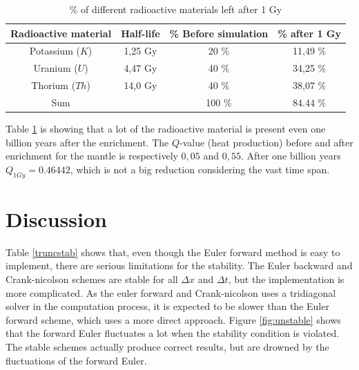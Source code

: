 \documentclass[10pt,a4paper]{article}
\begin{document}
\begin{table} [H]
\centering
\caption{\% of different radioactive materials left after 1 Gy}
\begin{tabular}{|c|c|c|c|}
\hline
Radioactive material & Half-life & \% Before simulation & \% after 1 Gy\\
\hline
Potassium ($K$) 	 & 1,25 Gy   & 20 \% 				 & 11,49 \% \\
\hline
Uranium ($U$)	     & 4,47 Gy   & 40 \%				 & 34,25 \% \\
\hline
Thorium ($Th$)		 & 14,0 Gy	 & 40 \%				 & 38,07 \% \\
\hline
Sum					 & 			 & 100 \% 				 & 84.44 \%\\
\hline
\end{tabular}
\label{Decay}
\end{table}

\noindent Table \ref{Decay} is showing that a lot of the radioactive material is present even one billion years after the enrichment. The $Q$-value (heat production) before and after enrichment for the mantle is respectively $0,05$ and $0,55$. After one billion years $Q_{1Gy}=0.46442$, which is not a big reduction considering the vast time span.   


\section*{Discussion}

Table \ref{truncstab} shows that, even though the Euler forward method is easy to implement, there are serious limitations for the stability. The Euler backward and Crank-nicolson schemes are stable for all $\Delta x$ and $\Delta t$, but the implementation is more complicated. As the euler forward and Crank-nicolson uses a tridiagonal solver in the computation process, it is expected to be slower than the Euler forward scheme, which uses a more direct approach. Figure \ref{fig:unstable} shows that the forward Euler fluctuates a lot when the stability condition is violated. The stable schemes actually produce correct results, but are drowned by the fluctuations of the forward Euler. 
\\
\end{document}
